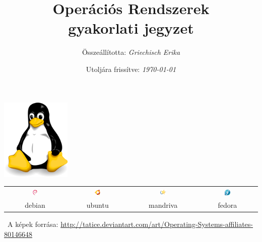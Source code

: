 \documentclass[a4paper]{article}
\author{Összeállította: \textit{Griechisch Erika}}
\title{{\huge \sc Operációs Rendszerek}\\gyakorlati jegyzet}
\date{\small Utoljára frissítve: \textit{\today}}
\begin{document}
{}
\vspace{30mm}
\maketitle
\thispagestyle{empty}
\vspace{30mm}


\begin{center}
\includegraphics[width=0.25\textwidth]{pics/Linux_Logo}

\vspace{10mm}

\begin{tabular}{cccc}
	\includegraphics[width=0.1\textwidth]{pics/Debian}
	&
	\includegraphics[width=0.1\textwidth]{pics/Ubuntu}
	&
	\includegraphics[width=0.1\textwidth]{pics/Mandriva}
	&
	\includegraphics[width=0.1\textwidth]{pics/Fedora}
	  \\
	  debian	& ubuntu & mandriva & fedora	
  \end{tabular}

%

\vfill 
\small \ccLogo\ A képek forrása: \url{http://tatice.deviantart.com/art/Operating-Systems-affiliates-80146648}
\end{center}
\end{document}

